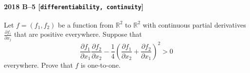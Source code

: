 \paragraph{2018 B--5 \textnormal{[\texttt{differentiability, continuity}]}}
Let $f = (f_1, f_2)$ be a function from $\mathbb{R}^2$ to $\mathbb{R}^2$ with continuous partial derivatives
$\frac{\partial f_i}{\partial x_j}$ that are positive everywhere. Suppose that
\[
\frac{\partial f_1}{\partial x_1} \frac{\partial f_2}{\partial x_2} - \frac{1}{4} \left( \frac{\partial f_1}{\partial x_2}  + \frac{\partial f_2}{\partial x_1} \right)^2 > 0
\]
everywhere. Prove that $f$ is one-to-one.
